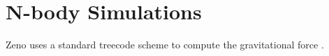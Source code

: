 \section{N-body Simulations}
\label{sec:Nbody}

Zeno uses a standard treecode scheme to compute the gravitational force \citep{Barnes1986}. 


